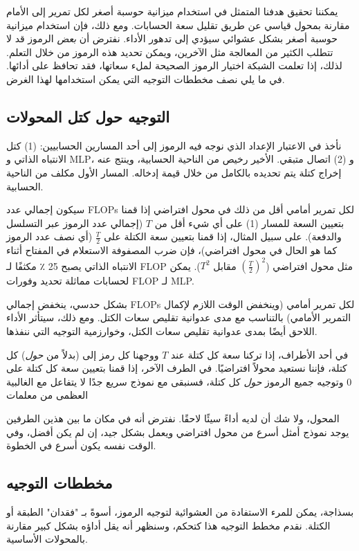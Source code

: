 \documentclass[11pt, a4paper, onecolumn, logo, copyright]{googledeepmind}
\begin{document}
يمكننا تحقيق هدفنا المتمثل في استخدام ميزانية حوسبة أصغر لكل تمرير إلى الأمام مقارنة بمحول قياسي عن طريق تقليل سعة الحسابات. ومع ذلك، فإن استخدام ميزانية حوسبة أصغر بشكل عشوائي سيؤدي إلى تدهور الأداء. نفترض أن \textit{بعض} الرموز قد لا تتطلب الكثير من المعالجة مثل الآخرين، ويمكن تحديد هذه الرموز من خلال التعلم. لذلك، إذا تعلمت الشبكة اختيار الرموز الصحيحة لملء سعاتها، فقد تحافظ على أدائها. في ما يلي نصف مخططات التوجيه التي يمكن استخدامها لهذا الغرض.

\subsection{التوجيه حول كتل المحولات}
\label{sec:routing-to-nowhere}
نأخذ في الاعتبار الإعداد الذي نوجه فيه الرموز إلى أحد المسارين الحسابيين: (1) كتل الانتباه الذاتي و MLP، و (2) اتصال متبقي. الأخير رخيص من الناحية الحسابية، وينتج عنه إخراج كتلة يتم تحديده بالكامل من خلال قيمة إدخاله. المسار الأول مكلف من الناحية الحسابية.

سيكون إجمالي عدد FLOPs لكل تمرير أمامي أقل من ذلك في محول افتراضي إذا قمنا بتعيين السعة للمسار (1) على أي شيء أقل من $T$ (إجمالي عدد الرموز عبر التسلسل والدفعة). على سبيل المثال، إذا قمنا بتعيين سعة الكتلة على $\frac{T}{2}$ (أي نصف عدد الرموز كما هو الحال في محول افتراضي)، فإن ضرب المصفوفة الاستعلام في المفتاح أثناء الانتباه الذاتي يصبح 25 ٪ مكثفًا لـ FLOP مثل محول افتراضي ($(\frac{T}{2})^2$ مقابل $T^2$). يمكن لحسابات مماثلة تحديد وفورات FLOP لـ MLP.

بشكل حدسي، ينخفض إجمالي FLOPs لكل تمرير أمامي (وينخفض الوقت اللازم لإكمال التمرير الأمامي) بالتناسب مع مدى عدوانية تقليص سعات الكتل. ومع ذلك، سيتأثر الأداء اللاحق أيضًا بمدى عدوانية تقليص سعات الكتل، وخوارزمية التوجيه التي ننفذها.

في أحد الأطراف، إذا تركنا سعة كل كتلة عند $T$ ووجهنا كل رمز إلى (بدلاً من \emph{حول}) كل كتلة، فإننا نستعيد محولاً افتراضيًا. في الطرف الآخر، إذا قمنا بتعيين سعة كل كتلة على $0$ وتوجيه جميع الرموز \emph{حول} كل كتلة، فسنبقى مع نموذج سريع جدًا لا يتفاعل مع الغالبية العظمى من معلمات

المحول، ولا شك أن لديه أداءً سيئًا لاحقًا. نفترض أنه في مكان ما بين هذين الطرفين يوجد نموذج أمثل أسرع من محول افتراضي ويعمل بشكل جيد، إن لم يكن أفضل، وفي الوقت نفسه يكون أسرع في الخطوة.

\subsection{مخططات التوجيه}
\label{sec:routing-scheme}
بسذاجة، يمكن للمرء الاستفادة من العشوائية لتوجيه الرموز، أسوةً بـ "فقدان" الطبقة أو الكتلة. نقدم مخطط التوجيه هذا كتحكم، وسنظهر أنه يقل أداؤه بشكل كبير مقارنة بالمحولات الأساسية.
\end{document}
